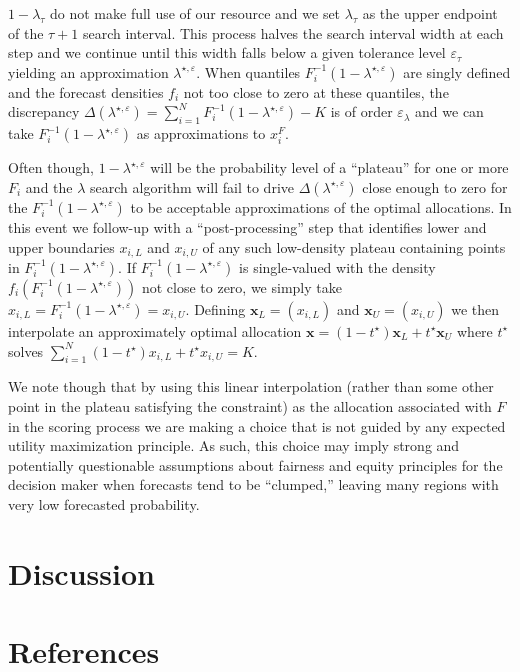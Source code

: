 \documentclass{article}
\begin{document}
$1-\lambda_{\tau}$ do not make full use of our resource and we set $\lambda_{\tau}$ as the upper endpoint of the $\tau + 1$ search interval.  This process halves the search interval width at each step and we continue until this width falls below a given tolerance level $\varepsilon_{\tau}$ yielding an 
approximation $\lambda^{\star, \varepsilon}$. When quantiles $F_i^{-1}(1-\lambda^{\star, \varepsilon})$ are singly defined and the forecast densities $f_i$
not too close to zero at these quantiles, the discrepancy $\Delta(\lambda^{\star, \varepsilon})  = \sum_{i=1}^{N} F_{i}^{-1}(1-\lambda^{\star, \varepsilon}) - K$ is of order $\varepsilon_{\lambda}$ and we can take $F_{i}^{-1}(1-\lambda^{\star, \varepsilon})$ as approximations to $x_i^F$.

Often though, $1-\lambda^{\star, \varepsilon}$ will be the probability level of a ``plateau'' for one or more $F_i$ and the $\lambda$ search algorithm will fail to drive $\Delta(\lambda^{\star, \varepsilon})$ close enough to zero for the $F_{i}^{-1}(1-\lambda^{\star, \varepsilon})$ to be acceptable approximations of the optimal allocations. In this event we follow-up with a ``post-processing'' step that identifies lower and upper boundaries $x_{i,L}$ and $x_{i,U}$ of any
such low-density plateau containing points in $F_{i}^{-1}(1-\lambda^{\star, \varepsilon})$. If $F_{i}^{-1}(1-\lambda^{\star, \varepsilon})$ is single-valued 
with the density $f_i(F_{i}^{-1}(1-\lambda^{\star, \varepsilon}))$ not close to zero, we simply take $x_{i,L} = F_{i}^{-1}(1-\lambda^{\star, \varepsilon}) = x_{i,U}$. Defining $\mathbf{x}_L = (x_{i,L})$ and $\mathbf{x}_U = (x_{i,U})$ we then interpolate an approximately optimal allocation 
$\mathbf{x} = (1-t^{\star})\mathbf{x}_L + t^{\star}\mathbf{x}_U$ where $t^{\star}$ solves 
$\sum_{i=1}^{N }(1-t^{\star})x_{i,L} + t^{\star}x_{i,U} = K$.

We note though that by using this linear interpolation (rather than some other point in the plateau satisfying the constraint) as the allocation associated with $F$ in the scoring process we are making a choice that is not
guided by any expected utility maximization principle. As such, this choice may imply strong and potentially questionable assumptions about fairness and
equity principles for the decision maker when forecasts tend to be ``clumped,'' leaving many regions with very low forecasted probability.


\section{Discussion}
\label{sec:discussion}


\section{References}


\end{document}
